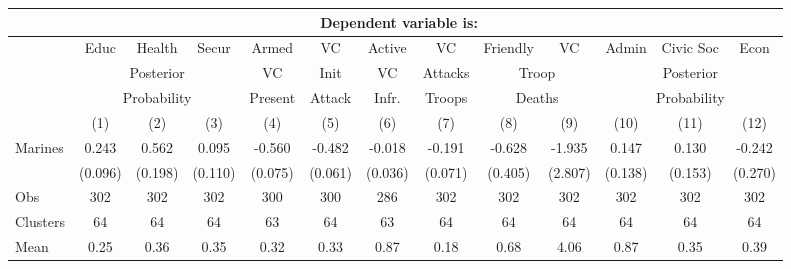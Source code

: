 \begin{tabular}{lcccccccccccc}
\hline  & \multicolumn{11}{c}{Dependent variable is:} & \\
\hline  & Educ & Health & Secur & Armed & VC & Active & VC & Friendly & VC & Admin & Civic Soc & Econ\\
 & \multicolumn{3}{c}{Posterior} & VC & Init & VC & Attacks & \multicolumn{2}{c}{Troop} & \multicolumn{3}{c}{Posterior}\\
 & \multicolumn{3}{c}{Probability} & Present & Attack & Infr. & Troops & \multicolumn{2}{c}{Deaths} & \multicolumn{3}{c}{Probability}\\
 & (1) & (2) & (3) & (4) & (5) & (6) & (7) & (8) & (9) & (10) & (11) & (12)\\
\hline Marines & 0.243 & 0.562 & 0.095 & -0.560 & -0.482 & -0.018 & -0.191 & -0.628 & -1.935 & 0.147 & 0.130 & -0.242\\
 & (0.096) & (0.198) & (0.110) & (0.075) & (0.061) & (0.036) & (0.071) & (0.405) & (2.807) & (0.138) & (0.153) & (0.270)\\
Obs & 302 & 302 & 302 & 300 & 300 & 286 & 302 & 302 & 302 & 302 & 302 & 302\\
Clusters & 64  & 64  & 64  & 63  & 64  & 63  & 64  & 64  & 64  & 64  & 64  & 64 \\
Mean & 0.25 & 0.36 & 0.35 & 0.32 & 0.33 & 0.87 & 0.18 & 0.68 & 4.06 & 0.87 & 0.35 & 0.39\\
\hline\end{tabular}\\

